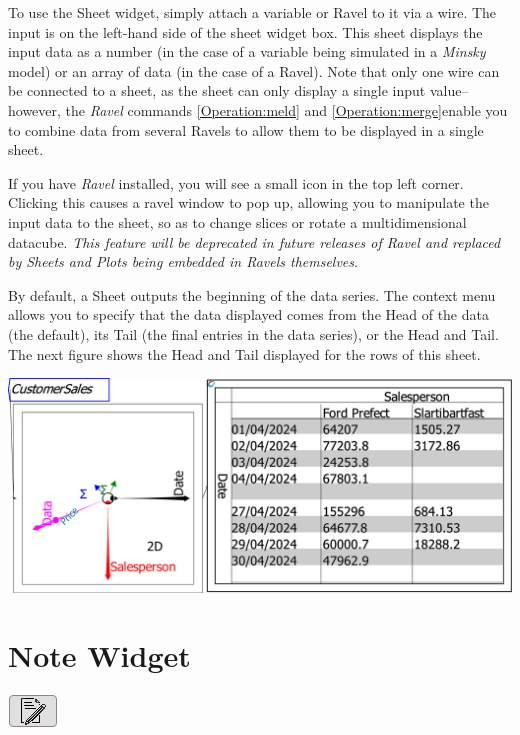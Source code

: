 To use the Sheet widget, simply attach a variable or Ravel to it via
a wire. The input is on the left-hand side of the sheet widget box.
This sheet displays the input data as a number (in the case of a variable
being simulated in a \emph{Minsky} model) or an array of data (in
the case of a Ravel). Note that only one wire can be connected to
a sheet, as the sheet can only display a single input value--however,
the \emph{Ravel} commands \ref{Operation:meld} and \ref{Operation:merge}enable
you to combine data from several Ravels to allow them to be displayed
in a single sheet.

If you have \emph{Ravel}\texttrademark{} installed, you will see a
small  icon in the top left corner. Clicking
this causes a ravel window to pop up, allowing you to manipulate the
input data to the sheet, so as to change slices or rotate a multidimensional
datacube. \emph{This feature will be deprecated in future releases
of Ravel and replaced by Sheets and Plots being embedded in Ravels
themselves}.

By default, a Sheet outputs the beginning of the data series. The
context menu allows you to specify that the data displayed comes from
the Head of the data (the default), its Tail (the final entries in
the data series), or the Head and Tail. The next figure shows the
Head and Tail displayed for the rows of this sheet.

\includegraphics[width=15cm]{images/SheetHeadTailSmallBusiness}

\section{Note Widget}

\label{Notes}\label{Item}

\includegraphics{images/NoteWidget}

